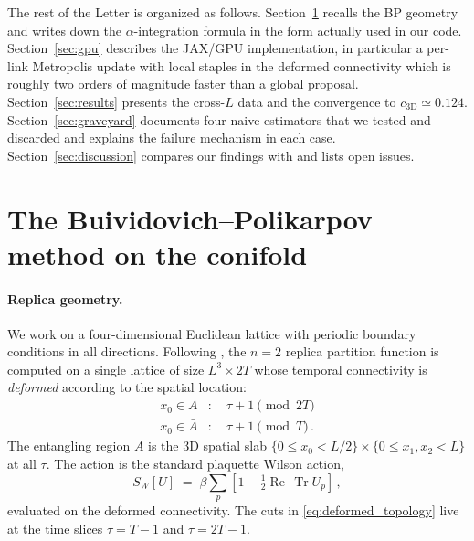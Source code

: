 \documentclass[aps,prl,reprint,superscriptaddress,floatfix,nofootinbib,amssymb]{revtex4-2}
\newcommand{\Tr}{\operatorname{Tr}}
\renewcommand{\Re}{\operatorname{Re}}
\begin{document}
The rest of the Letter is organized as follows. Section~\ref{sec:method} recalls the BP geometry and writes down the $\alpha$-integration formula in the form actually used in our code. Section~\ref{sec:gpu} describes the JAX/GPU implementation, in particular a per-link Metropolis update with local staples in the deformed connectivity which is roughly two orders of magnitude faster than a global proposal. Section~\ref{sec:results} presents the cross-$L$ data and the convergence to $c_{3\text{D}}\!\simeq\!0.124$. Section~\ref{sec:graveyard} documents four naive estimators that we tested and discarded and explains the failure mechanism in each case. Section~\ref{sec:discussion} compares our findings with \cite{Rabenstein2019,Rindlisbacher2022,Donnelly2012,DonnellyWall2014} and lists open issues.

\section{The Buividovich--Polikarpov method on the conifold}
\label{sec:method}

\paragraph{Replica geometry.}
We work on a four-dimensional Euclidean lattice with periodic boundary conditions in all directions. Following \cite{BP2008b,Rabenstein2019}, the $n=2$ replica partition function is computed on a single lattice of size $L^3\!\times\!2T$ whose temporal connectivity is \emph{deformed} according to the spatial location:
\begin{align}
x_0 \in A&: \quad \tau\!+\!1 \pmod{2T} \nonumber \\
x_0 \in \bar A&: \quad \tau\!+\!1 \pmod{T}\,.
\label{eq:deformed_topology}
\end{align}
The entangling region $A$ is the 3D spatial slab $\{0\le x_0 < L/2\}\times\{0\le x_1,x_2 < L\}$ at all $\tau$. The action is the standard plaquette Wilson action,
\begin{equation}
S_W[U] \;=\; \beta \sum_p \left[ 1 - \tfrac{1}{2}\Re\,\Tr U_p\right]\,,
\label{eq:wilson}
\end{equation}
evaluated on the deformed connectivity. The cuts in \eqref{eq:deformed_topology} live at the time slices $\tau = T-1$ and $\tau = 2T-1$.
\end{document}
